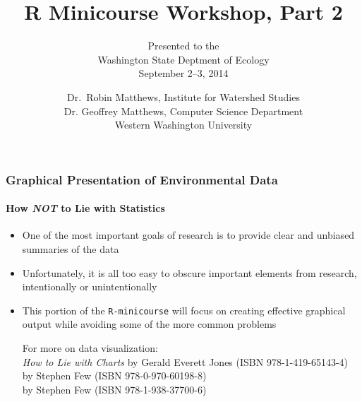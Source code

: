 \documentclass[10pt]{beamer}
\title{R Minicourse Workshop, Part 2}
\author{\small Presented to the\\
        Washington State Deptment of Ecology\\
       September 2--3, 2014}
\date{\scriptsize Dr.~Robin Matthews, Institute for Watershed Studies\\
   Dr. Geoffrey Matthews, Computer Science Department\\
   Western Washington University}
\begin{document}
\newcommand{\be}{\begin{enumerate}}
\newcommand{\ee}{\end{enumerate}}
\newcommand{\bi}{\begin{itemize}}
\newcommand{\ei}{\end{itemize}}
\newcommand{\bd}{\begin{description}}
\newcommand{\ed}{\end{description}}


\begin{frame}
\titlepage
\end{frame}

\begin{frame}
\frametitle{Graphical Presentation of Environmental Data}
\framesubtitle{How {\color{red} \em NOT} to Lie with Statistics}
\bi
\item One of the most important goals of research is to provide clear
  and unbiased summaries of the data

\item Unfortunately, it is all too easy to obscure important elements from
  research, intentionally or unintentionally

\item This portion of the {\color{red} \tt R-minicourse} will focus on
  creating effective graphical output while avoiding some of the
  more common problems

{\scriptsize
For more on data visualization:\\
{\em How to Lie with Charts} by Gerald Everett Jones (ISBN 978-1-419-65143-4)\\

\vspace{1ex}{\em Now You See It: Simple Visualization Techniques for
  Quantitative Analysis} by Stephen Few (ISBN 978-0-970-60198-8)\\

\vspace{1ex}{\em Information Dashboard Design: Displaying Data for
  At-a-Glance Monitoring} by Stephen Few (ISBN 978-1-938-37700-6)\\ }
\ei
\end{frame}
\end{document}
